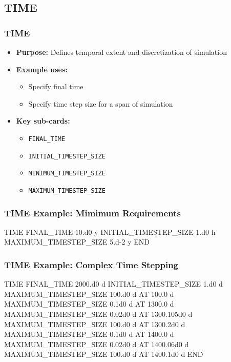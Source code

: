\subsection{TIME}

\begin{frame}\frametitle{TIME}

\begin{itemize}
\item[] \textbf{Purpose:} Defines temporal extent and discretization of simulation
\item[] \textbf{Example uses:}
\begin{itemize}
  \item Specify final time
  \item Specify time step size for a span of simulation
\end{itemize}
\item[] \textbf{Key sub-cards:}
\begin{itemize}
  \item[] \verb|FINAL_TIME|
  \item[] \verb|INITIAL_TIMESTEP_SIZE|
  \item[] \verb|MINIMUM_TIMESTEP_SIZE|
  \item[] \verb|MAXIMUM_TIMESTEP_SIZE|
\end{itemize}
\end{itemize}

\end{frame}

\begin{frame}[fragile]\frametitle{TIME Example: Mimimum Requirements}

\begin{semiverbatim}
TIME
  FINAL_TIME 10.d0 y
  INITIAL_TIMESTEP_SIZE 1.d0 h
  MAXIMUM_TIMESTEP_SIZE 5.d-2 y
END
\end{semiverbatim}

\end{frame}

\begin{frame}[fragile]\frametitle{TIME Example: Complex Time Stepping}

\begin{semiverbatim}
TIME
  FINAL_TIME 2000.d0 d
  INITIAL_TIMESTEP_SIZE 1.d0 d
  MAXIMUM_TIMESTEP_SIZE 100.d0 d AT 100.0 d
  MAXIMUM_TIMESTEP_SIZE 0.1d0 d AT 1300.0 d
  MAXIMUM_TIMESTEP_SIZE 0.02d0 d AT 1300.105d0 d
  MAXIMUM_TIMESTEP_SIZE 100.d0 d AT 1300.2d0 d
  MAXIMUM_TIMESTEP_SIZE 0.1d0 d AT 1400.0 d
  MAXIMUM_TIMESTEP_SIZE 0.02d0 d AT 1400.06d0 d
  MAXIMUM_TIMESTEP_SIZE 100.d0 d AT 1400.1d0 d
END
\end{semiverbatim}

\end{frame}
